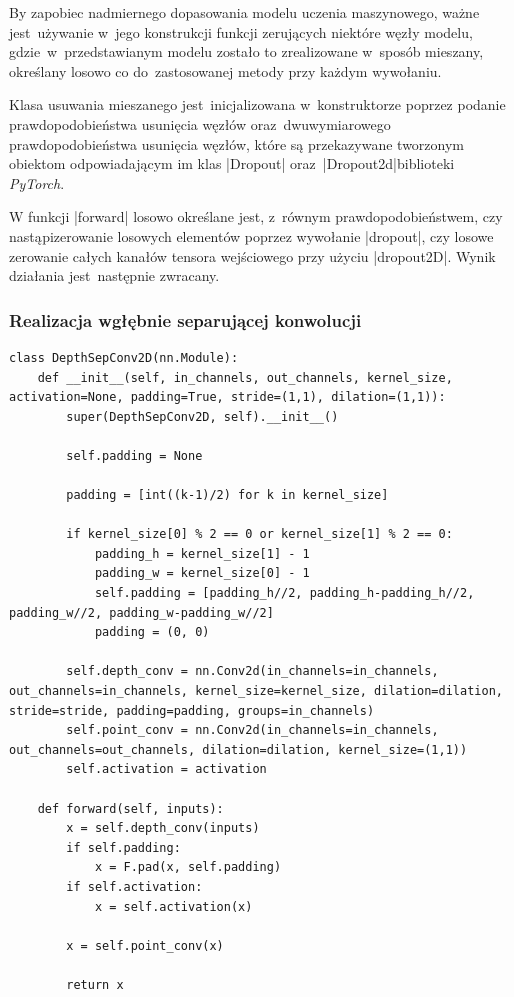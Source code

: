By zapobiec nadmiernego dopasowania modelu uczenia maszynowego, ważne jest~używanie w~jego konstrukcji funkcji zerujących niektóre węzły modelu, gdzie~w~przedstawianym modelu zostało to zrealizowane w~sposób mieszany, określany losowo co do~zastosowanej metody przy każdym wywołaniu.

Klasa usuwania mieszanego jest~inicjalizowana w~konstruktorze poprzez podanie prawdopodobieństwa usunięcia węzłów oraz~dwuwymiarowego prawdopodobieństwa usunięcia węzłów, które są przekazywane tworzonym obiektom odpowiadającym im klas \pyth|Dropout| oraz~\pyth|Dropout2d|\linebreak biblioteki \textit{PyTorch}.

W funkcji \pyth|forward| losowo określane jest, z~równym prawdopodobieństwem, czy nastąpi\linebreak zerowanie losowych elementów poprzez wywołanie \pyth|dropout|, czy losowe zerowanie całych kanałów tensora wejściowego przy użyciu \pyth|dropout2D|. Wynik działania jest~następnie zwracany. 


\subsubsection{Realizacja wgłębnie separującej konwolucji}

\begin{lstlisting}[caption={\pyth|DepSepConv2D| - klasa wgłębnie separującej konwolucji dwuwymiarowej.}, label={DepSepConv}]
class DepthSepConv2D(nn.Module):
	def __init__(self, in_channels, out_channels, kernel_size, activation=None, padding=True, stride=(1,1), dilation=(1,1)):
		super(DepthSepConv2D, self).__init__()
	
		self.padding = None
		
		padding = [int((k-1)/2) for k in kernel_size]
		
		if kernel_size[0] % 2 == 0 or kernel_size[1] % 2 == 0:
			padding_h = kernel_size[1] - 1
			padding_w = kernel_size[0] - 1
			self.padding = [padding_h//2, padding_h-padding_h//2, padding_w//2, padding_w-padding_w//2]
			padding = (0, 0)
		
		self.depth_conv = nn.Conv2d(in_channels=in_channels, out_channels=in_channels, kernel_size=kernel_size, dilation=dilation, stride=stride, padding=padding, groups=in_channels)
		self.point_conv = nn.Conv2d(in_channels=in_channels, out_channels=out_channels, dilation=dilation, kernel_size=(1,1))
		self.activation = activation
	
	def forward(self, inputs):
		x = self.depth_conv(inputs)
		if self.padding:
			x = F.pad(x, self.padding)
		if self.activation:
			x = self.activation(x)
		
		x = self.point_conv(x)
		
		return x
\end{lstlisting}


